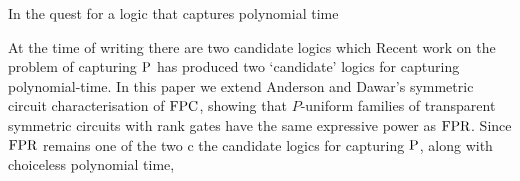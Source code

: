 \documentclass[../paper.tex]{subfiles}
\begin{document}
In the quest for a logic that captures polynomial time 

At the time of writing there are two candidate logics which 
Recent work on the problem of capturing $\mathrm{P}$ has produced two `candidate'
logics for capturing polynomial-time.
In this paper we extend Anderson and Dawar's symmetric circuit characterisation
of $\text{\upshape FPC}$, showing that $P$-uniform families of transparent symmetric circuits
with rank gates have the same expressive power as $\text{\upshape FPR}$. Since $\text{\upshape FPR}$ remains
one of the two c
the candidate logics for capturing $\mathrm{P}$, along with choiceless polynomial time, 
\end{document}
